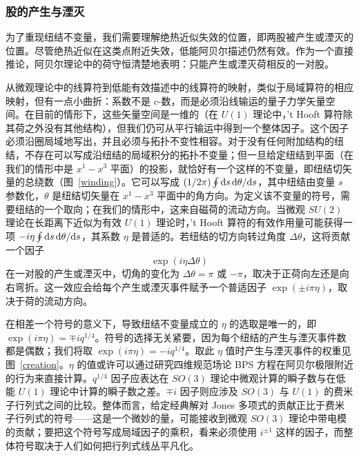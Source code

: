 \subsubsection{股的产生与湮灭}\label{creand}

为了重现纽结不变量，我们需要理解绝热近似失效的位置，即两股被产生或湮灭的位置。尽管绝热近似在这类点附近失效，低能阿贝尔描述仍然有效。作为一个直接推论，阿贝尔理论中的荷守恒清楚地表明：只能产生或湮灭荷相反的一对股。


从微观理论中的线算符到低能有效描述中的线算符的映射，类似于局域算符的相应映射，但有一点小曲折：系数不是 $c$-数，而是必须沿线输运的量子力学矢量空间。在目前的情形下，这些矢量空间是一维的（在 $U(1)$ 理论中，'t Hooft 算符除其荷之外没有其他结构），但我们仍可从平行输运中得到一个整体因子。这个因子必须沿圈局域地写出，并且必须与拓扑不变性相容。对于没有任何附加结构的纽结，不存在可以写成沿纽结的局域积分的拓扑不变量；但一旦给定纽结到平面（在我们的情形中是 $x^1-x^3$ 平面）的投影，就恰好有一个这样的不变量，即纽结切矢量的总绕数（图~\ref{winding}）。它可以写成 $(1/2\pi)\oint {\mathrm d} s\,{\mathrm d} \theta/{\mathrm d} s$，其中纽结由变量 $s$ 参数化，$\theta$ 是纽结切矢量在 $x^1-x^3$ 平面中的角方向。为定义该不变量的符号，需要纽结的一个取向；在我们的情形中，这来自磁荷的流动方向。当微观 $SU(2)$ 理论在长距离下近似为有效 $U(1)$ 理论时，'t Hooft 算符的有效作用量可能获得一项 $-i\eta\oint {\mathrm d} s \,{\mathrm d} \theta/{\mathrm d} s$，其系数 $\eta$ 是普适的。若纽结的切方向转过角度 $\Delta\theta$，这将贡献一个因子
\begin{equation}
\exp (i\eta \Delta \theta)
\end{equation}
在一对股的产生或湮灭中，切角的变化为 $\Delta\theta=\pi$ 或 $-\pi$，取决于正荷向左还是向右弯折。这一效应会给每个产生或湮灭事件赋予一个普适因子 $\exp(\pm i\pi \eta)$，取决于荷的流动方向。

在相差一个符号的意义下，导致纽结不变量成立的 $\eta$ 的选取是唯一的，即 $\exp(i\pi\eta)=\mp iq^{1/4}$。符号的选择无关紧要，因为每个纽结的产生与湮灭事件数都是偶数；我们将取 $\exp(i\pi\eta)=-iq^{1/4}$。取此 $\eta$ 值时产生与湮灭事件的权重见图~\ref{creation}。$\eta$ 的值或许可以通过研究四维规范场论 BPS 方程在阿贝尔极限附近的行为来直接计算。$q^{1/4}$ 因子应表达在 $SO(3)$ 理论中微观计算的瞬子数与在低能 $U(1)$ 理论中计算的瞬子数之差。$\mp i$ 因子则应涉及 $SO(3)$ 与 $U(1)$ 的费米子行列式之间的比较。整体而言，给定经典解对 Jones 多项式的贡献正比于费米子行列式的符号——这是一个微妙的量，可能接收到微观 $SO(3)$ 理论中带电模的贡献；要把这个符号写成局域因子的乘积，看来必须使用 $i^{\pm 1}$ 这样的因子，而整体符号取决于人们如何把行列式线丛平凡化。

